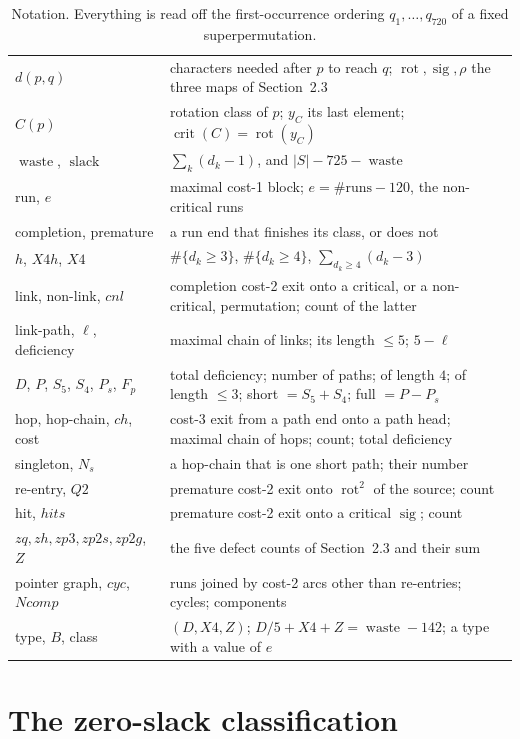 \documentclass[10pt]{article}
\theoremstyle{remark}
\theoremstyle{plain}
\newcommand{\NCh}{\mathit{ch}}
\newcommand{\Ncyc}{\mathit{cyc}}
\newcommand{\crit}{\operatorname{crit}}
\newcommand{\rot}{\operatorname{rot}}
\newcommand{\sig}{\operatorname{sig}}
\newcommand{\slack}{\operatorname{slack}}
\newcommand{\waste}{\operatorname{waste}}
\begin{document}
\begin{table}[H]\centering\footnotesize
\caption{Notation.  Everything is read off the first-occurrence
ordering $q_1,\dots,q_{720}$ of a fixed superpermutation.}
\label{tab:notation}
\begin{tabular}{@{}l p{}@{}}
\toprule
$d(p,q)$ & characters needed after $p$ to reach $q$; $\rot,\sig,\rho$ the three maps of Section~2.3\\
$C(p)$ & rotation class of $p$; $y_C$ its last element; $\crit(C)=\rot(y_C)$\\
$\waste$, $\slack$ & $\sum_k(d_k-1)$, and $|S|-725-\waste$\\
run, $e$ & maximal cost-1 block; $e=\#\text{runs}-120$, the non-critical runs\\
completion, premature & a run end that finishes its class, or does not\\
$h$, $X4h$, $X4$ & $\#\{d_k\ge 3\}$, $\#\{d_k\ge 4\}$, $\sum_{d_k\ge 4}(d_k-3)$\\
link, non-link, $\mathit{cnl}$ & completion cost-2 exit onto a critical, or a non-critical, permutation; count of the latter\\
link-path, $\ell$, deficiency & maximal chain of links; its length $\le 5$; $5-\ell$\\
$D$, $P$, $S_5$, $S_4$, $P_s$, $F_p$ & total deficiency; number of paths; of length $4$; of length $\le 3$; short $=S_5+S_4$; full $=P-P_s$\\
hop, hop-chain, $\NCh$, cost & cost-3 exit from a path end onto a path head; maximal chain of hops; count; total deficiency\\
singleton, $N_s$ & a hop-chain that is one short path; their number\\
re-entry, $Q2$ & premature cost-2 exit onto $\rot^2$ of the source; count\\
hit, $\mathit{hits}$ & premature cost-2 exit onto a critical $\sig$; count\\
$zq,zh,zp3,zp2s,zp2g$, $Z$ & the five defect counts of Section~2.3 and their sum\\
pointer graph, $\Ncyc$, $\mathit{Ncomp}$ & runs joined by cost-2 arcs other than re-entries; cycles; components\\
type, $B$, class & $(D,X4,Z)$; $D/5+X4+Z=\waste-142$; a type with a value of $e$\\
\bottomrule
\end{tabular}
\end{table}

\section{The zero-slack classification}\label{sec:classes}
\end{document}
